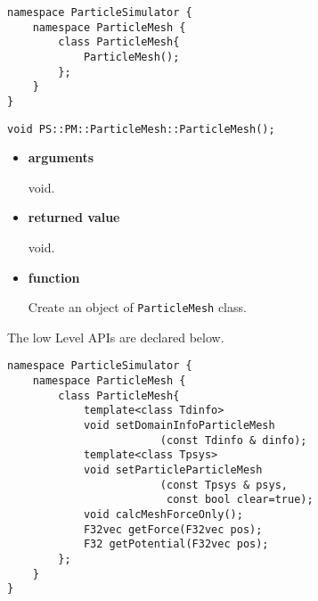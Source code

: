 


\begin{lstlisting}[caption=ParticleMesh1]
namespace ParticleSimulator {
    namespace ParticleMesh {
        class ParticleMesh{
            ParticleMesh();
        };
    }
}
\end{lstlisting}


\begin{screen}
\begin{verbatim}
void PS::PM::ParticleMesh::ParticleMesh();
\end{verbatim}
\end{screen}

\begin{itemize}

\item {\bf arguments}

void.

\item {\bf returned value}

void.

\item {\bf function}

Create an object of {\tt ParticleMesh} class.


\end{itemize}



The low Level APIs are declared below.

\begin{lstlisting}[caption=ParticleMesh1]
namespace ParticleSimulator {
    namespace ParticleMesh {
        class ParticleMesh{
            template<class Tdinfo>
            void setDomainInfoParticleMesh
                        (const Tdinfo & dinfo);
            template<class Tpsys>
            void setParticleParticleMesh
                        (const Tpsys & psys,
                         const bool clear=true);
            void calcMeshForceOnly();
            F32vec getForce(F32vec pos);
            F32 getPotential(F32vec pos);
        };
    }
}
\end{lstlisting}


